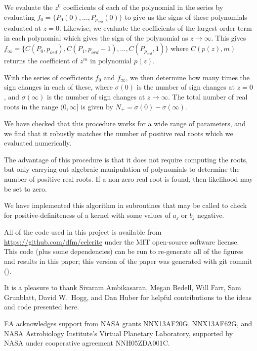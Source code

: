 \documentclass[manuscript, letterpaper]{aastex6}
\begin{document}
We evaluate the $z^0$ coefficients of each of the polynomial in the series by evaluating $f_0 = \{P_0(0),...,P_{p_{ord}}(0)\}$ to
give us the signs of these polynomials evaluated at $z=0$.
Likewise, we evaluate the coefficients of the largest order term in each polynomial which gives the sign of the polynomial
as $z \rightarrow \infty$.  This gives $f_\infty = \{C(P_0,p_{ord}),C(P_1,p_{ord}-1),..., C(P_{p_{ord}},1)\}$ where
$C(p(z),m)$ returns the coefficient of $z^m$ in polynomial $p(z)$.

With the series of coefficients $f_0$ and $f_\infty$, we then determine how many times the sign changes in each
of these, where $\sigma(0)$ is the number of sign changes at $z=0$, and $\sigma(\infty)$ is the number of sign
changes at $z \rightarrow \infty$.  The total number of real roots in the range $(0,\infty]$ is given
by $N_{+}=\sigma(0)-\sigma(\infty)$.

We have checked that this procedure works for a wide range of parameters, and we find that it robustly
matches the number of positive real roots which we evaluated numerically.

The advantage of this procedure is that it does not require computing the roots, but only carrying out algebraic
manipulation of polynomials to determine the number of positive real roots.  If a non-zero real root is found, then
likelihood may be set to zero.

We have implemented this algorithm in subroutines that may be called to check for positive-definiteness
of a kernel with some values of $a_j$ or $b_j$ negative.


\vspace{1.5em}
All of the code used in this project is available from
\url{https://github.com/dfm/celerite} under the MIT open-source software
license.
This code (plus some dependencies) can be run to re-generate all of the
figures and results in this paper; this version of the paper was generated
with git commit \texttt{\githash} (\gitdate).

\acknowledgments
It is a pleasure to thank
Sivaram Ambikasaran,
Megan Bedell,
Will Farr,
Sam Grunblatt,
David W.\ Hogg, and
Dan Huber
for helpful contributions to the ideas and code presented here.

EA acknowledges support from NASA grants NNX13AF20G, NNX13AF62G, and
NASA Astrobiology Institute's Virtual Planetary Laboratory, supported
by NASA under cooperative agreement NNH05ZDA001C.
\end{document}

